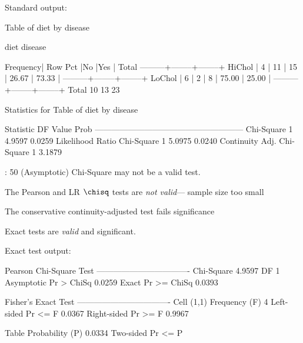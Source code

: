 \begin{frame}[fragile]
Standard output:
\begin{Output}[fontsize=\footnotesize,gobble=7,baselinestretch=.7]
                           Table of diet by disease

                     diet      disease

                     Frequency|
                     Row Pct  |No      |Yes     |  Total
                     ---------+--------+--------+
                     HiChol   |      4 |     11 |     15
                              |  26.67 |  73.33 |
                     ---------+--------+--------+
                     LoChol   |      6 |      2 |      8
                              |  75.00 |  25.00 |
                     ---------+--------+--------+
                     Total          10       13       23


                   Statistics for Table of diet by disease

            Statistic                     DF       Value      Prob
            ------------------------------------------------------
            Chi-Square                     1      4.9597    0.0259
            Likelihood Ratio Chi-Square    1      5.0975    0.0240
            Continuity Adj. Chi-Square     1      3.1879    

         : 50%
                  (Asymptotic) Chi-Square may not be a valid test.
\end{Output}
\begin{itemize*}
  \item The Pearson and LR $\chisq$ tests are \emph{not valid}--- sample size too small
  \item The conservative continuity-adjusted test fails significance
\end{itemize*}
\end{frame}

\begin{frame}[fragile]
\begin{itemize*}
  \item Exact tests are \emph{valid} and significant.
\end{itemize*}
Exact test output:
\begin{Output}[fontsize=\footnotesize,gobble=7,baselinestretch=.8]
            		   Pearson Chi-Square Test
        		  ----------------------------------
        		  Chi-Square                  4.9597
        		  DF                               1
        		  Asymptotic Pr >  ChiSq      0.0259
        		  Exact      Pr >= ChiSq      0.0393


                		 Fisher's Exact Test
        		  ----------------------------------
        		  Cell (1,1) Frequency (F)         4
        		  Left-sided Pr <= F          0.0367
        		  Right-sided Pr >= F         0.9967

        		  Table Probability (P)       0.0334
        		  Two-sided Pr <= P           
\end{Output}

\end{frame}

